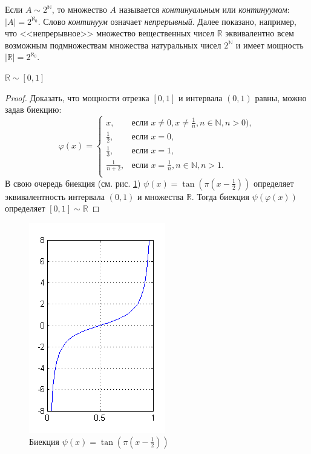 Если $A\sim 2^{\mathbb{N}}$, то множество $A$ называется \emph{континуальным} или \emph{континуумом}: $|A|=2^{\aleph_0}$. Слово \emph{континуум} означает \emph{непрерывный}. Далее показано, например, что <<непрерывное>> множество вещественных чисел $\mathbb{R}$ эквивалентно всем возможным подмножествам множества натуральных чисел $2^\mathbb{N}$ и имеет мощность $|\mathbb{R}|=2^{\aleph_0}$.

\begin{exampl}
    $\mathbb{R}\sim [0,1]$
\end{exampl}
\begin{proof}
    Доказать, что мощности отрезка $[0,1]$ и интервала $(0,1)$ равны, можно задав биекцию:
    \[
        \varphi(x)=
        \begin{cases}
            x,&\text{если $x\neq 0,x\neq\frac{1}{n},n\in\mathbb{N},n>0)$},\\
            \frac{1}{2},&\text{если $x=0$},\\
            \frac{1}{3},&\text{если $x=1$},\\
            \frac{1}{n+2},&\text{если $x=\frac{1}{n},n\in\mathbb{N},n>1$}.\\
        \end{cases}
    \]
    В свою очередь биекция (см. рис. \ref{fig:tanIsContToR}) $\psi(x)=\tan(\pi(x-\frac{1}{2}))$ определяет эквивалентность интервала $(0,1)$ и множества $\mathbb{R}$. Тогда биекция $\psi(\varphi(x))$ определяет $[0,1]\sim\mathbb{R}$
\end{proof}

\begin{figure}
    \centering
    \includegraphics{fig/tanx}
    \caption{Биекция $\psi(x)=\tan(\pi(x-\frac{1}{2}))$}
    \label{fig:tanIsContToR}
\end{figure} 

